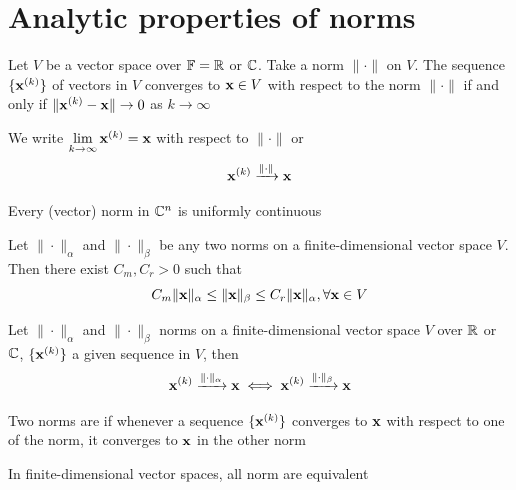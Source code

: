 \documentclass[aspectratio=169]{beamer}
\begin{document}
\section{Analytic properties of norms}
\label{sec:analytic_properties_norms}


\begin{frame}
\begin{definition}
Let $V$ be a vector space over $\mathbb{F}=\mathbb{R}$ or $\mathbb{C}$. Take a norm $\|\cdot\|$ on $V$. The sequence $\{\mathbf{x}^{(k)}\}$ of vectors in $V$ converges to $\mathbf{x}\in V$ with respect to the norm $\|\cdot\|$ if and only if $\| \mathbf{x}^{(k)}-\mathbf{x}\|\to 0$ as $k \to \infty$
\end{definition}
\vfill
We write $\lim\limits_{k \to \infty} \mathbf{x}^{(k)}=\mathbf{x}$ with respect to $\|\cdot\|$ or 
\[
    \mathbf{x}^{(k)} \xrightarrow{\| \cdot \|} \mathbf{x} 
\]
\end{frame}


\begin{frame}
\begin{theorem}
Every (vector) norm in $\mathbb{C}^n$ is uniformly continuous
\end{theorem}
\vfill
\begin{corollary}
Let $\| \cdot \|_{\alpha}$ and $\| \cdot \|_{\beta}$ be any two norms on a finite-dimensional vector space $V$. Then there exist $C_m, C_r>0$ such that 
\[
    C_m\| \mathbf{x}\|_{\alpha} \leq 
    \| \mathbf{x} \|_{\beta}\leq 
    C_r\| \mathbf{x}\|_{\alpha}, \forall \mathbf{x}\in V
\]
\end{corollary}
\end{frame}


\begin{frame}
\begin{corollary}
 Let $\|\cdot\|_{\alpha}$ and $\|\cdot\|_{\beta}$ norms on a finite-dimensional vector space $V$ over $\mathbb{R}$ or $\mathbb{C}$, $\{\mathbf{x}^{(k)}\}$ a given sequence in $V$, then 
 \[
    \mathbf{x}^{(k)} \xrightarrow{\| \cdot \|_{\alpha}} \mathbf{x} 
    \iff 
    \mathbf{x}^{(k)} \xrightarrow{\| \cdot \|_{\beta}}\mathbf{x} 
 \]
\end{corollary}
\end{frame}

\begin{frame}
\begin{definition}
Two norms are  if whenever a sequence $\{\mathbf{x}^{(k)}\}$ converges to $\mathbf{x}$ with respect to one of the norm, it converges to $\mathbf{x}$ in the other norm
\end{definition}
\vfill
\begin{theorem}
In finite-dimensional vector spaces, all norm are equivalent
\end{theorem}
\end{frame}
\end{document}
